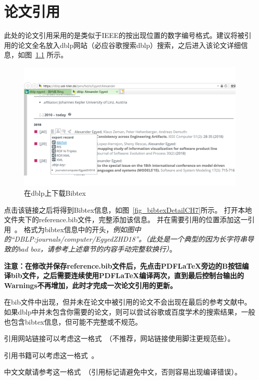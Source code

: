 \chapter{论文引用}

此处的论文引用采用的是类似于IEEE的按出现位置的数字编号格式。建议将被引用的论文全名放入dblp网站（必应谷歌搜索dblp）搜索，之后进入该论文详细信息，如图~\ref{fig_dblpForBibtexCH7} 所示。

\begin{figure}[htb]
  \centering
  \includegraphics[width=5in]{FIGs/chapter7/dblpForBibtex.pdf}
  \caption{在dblp上下载Bibtex}\label{fig_dblpForBibtexCH7}
\end{figure}

点击该链接之后将得到Bibtex信息，如图~\ref{fig_bibtexDetailCH7}所示。
打开本地文件夹下的reference.bib文件，完整添加该信息。
并在需要引用的位置添加这一引用~\cite{DBLP:journals/computer/EgyedZHD18}。
格式为bibtex信息中的开头，\emph{例如图中的“DBLP:journals/computer/EgyedZHD18”。（此处是一个典型的因为长字符串导致的bad box，请参考上述章节的内容手动完整软换行）}。

\textbf{注意：在修改并保存reference.bib文件后，先点击PDFLaTeX旁边的B按钮编译bib文件，之后需要连续使用PDFLaTeX编译两次，直到最后控制台输出的Warnings不再增加，此时才完成一次论文引用的更新。}

在bib文件中出现，但并未在论文中被引用的论文不会出现在最后的参考文献中。如果dblp中并未包含你需要的论文，则可以尝试谷歌或百度学术的搜索结果，一般也包含bibtex信息，但可能不完整或不规范。

引用网站链接可以考虑这一格式~\cite{GanttSystem}（不推荐，网站链接使用脚注更规范些）。

引用书籍可以考虑这一格式~\cite{Pohl2010Requirements}。

中文文献请参考这一格式~\cite{cyg2006}（引用标记请避免中文，否则容易出现编译错误）。

